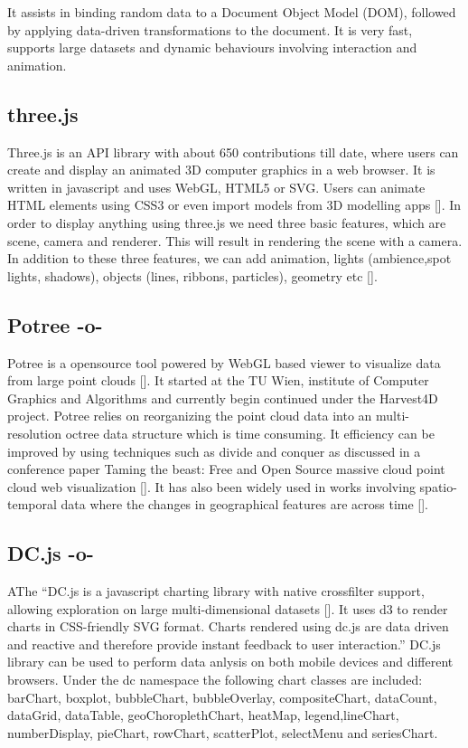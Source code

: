 It assists in binding random data to a Document Object Model (DOM),
followed by applying data-driven transformations to the document. It
is very fast, supports large datasets and dynamic behaviours involving
interaction and animation.

    
\subsection{three.js}

Three.js is an API library with about 650 contributions till date,
where users can create and display an animated 3D computer graphics in
a web browser. It is written in javascript and uses WebGL, HTML5 or
SVG. Users can animate HTML elements using CSS3 or even import models
from 3D modelling apps [\cite{www-threejs-wiki}]. In order to display
anything using three.js we need three basic features, which are scene,
camera and renderer. This will result in rendering the scene with a
camera. In addition to these three features, we can add animation,
lights (ambience,spot lights, shadows), objects (lines, ribbons,
particles), geometry etc [\cite{www-threejs-webpage}].
    
\subsection{Potree -o-}

Potree is a opensource tool powered by WebGL based viewer to visualize
data from large point clouds [\cite{www-potree}].  It started at the TU
Wien, institute of Computer Graphics and Algorithms and currently
begin continued under the Harvest4D project. Potree relies on
reorganizing the point cloud data into an multi-resolution octree data
structure which is time consuming. It efficiency can be improved by
using techniques such as divide and conquer as discussed in a
conference paper Taming the beast: Free and Open Source massive cloud
point cloud web visualization [\cite{potree-paper-1}]. It has also been
widely used in works involving spatio-temporal data where the changes
in geographical features are across time [\cite{potree-paper-2}].


    
\subsection{DC.js -o-}

AThe ``DC.js is a javascript charting library with
native crossfilter support, allowing exploration on large
multi-dimensional datasets [\cite{www-dcjs}]. It uses d3 to render
charts in CSS-friendly SVG format. Charts rendered using dc.js are
data driven and reactive and therefore provide instant feedback to
user interaction.'' DC.js library can be used to perform data anlysis
on both mobile devices and different browsers. Under the dc namespace
the following chart classes are included: barChart, boxplot,
bubbleChart, bubbleOverlay, compositeChart, dataCount, dataGrid,
dataTable, geoChoroplethChart, heatMap, legend,lineChart,
numberDisplay, pieChart, rowChart, scatterPlot, selectMenu and
seriesChart.


